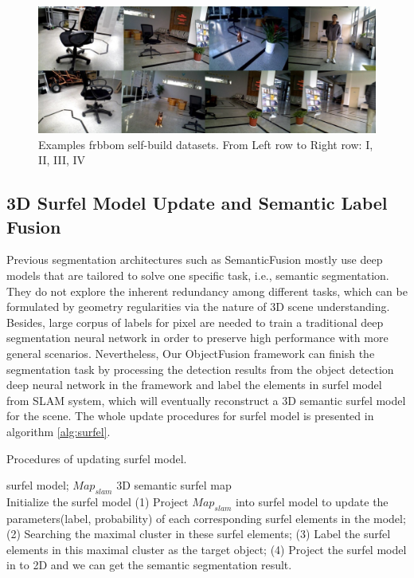 \documentclass[conference]{IEEEtran}
\begin{document}
\begin{figure}[htb]
	\centering
	\includegraphics[width=1\textwidth]{pic/fig5.jpg}
	\centering
	\caption{Examples frbbom self-build datasets.  From Left row to Right row: I, II, III, IV}
	\label{fig:examples}
\end{figure} 

\subsection{\textbf{3D Surfel Model Update and Semantic Label Fusion}}

Previous segmentation architectures such as SemanticFusion \cite{McCormac2017} mostly use deep models that are tailored to solve one specific task, i.e., semantic segmentation. They do not explore the inherent redundancy among different tasks, which can be formulated by geometry regularities via the nature of 3D scene understanding. Besides, large corpus of labels for pixel are needed to train a traditional deep segmentation neural network in order to preserve high performance with more general scenarios. Nevertheless, Our ObjectFusion framework can finish the segmentation task by processing  the detection results from the  object detection deep neural network in the framework and label the elements in surfel model \cite{stuckler2014multi} from SLAM system, which will eventually reconstruct a 3D semantic surfel model for the scene. The whole update procedures for surfel model is presented in  algorithm \ref{alg:surfel}.

\begin{algorithm}[h]  
	\caption{ Procedures of updating surfel model.}  
	\label{alg:surfel}  
	\begin{algorithmic}[1]  
		\Require  
		surfel model; $Map_{slam}$ 
		\Ensure  
		3D semantic surfel map
		 \\	
		Initialize the surfel model
		\Else 
		\State (1) Project $Map_{slam}$ into surfel model to update the parameters(label, probability) of each corresponding surfel elements in the model;
		\State (2) Searching the maximal cluster in these surfel elements;
		\State (3) Label the surfel elements in this maximal cluster as the target object;
		\State (4) Project the surfel model in to 2D and we can get the semantic segmentation result.
		\EndIf
	\end{algorithmic}  
\end{algorithm} 
\end{document}
